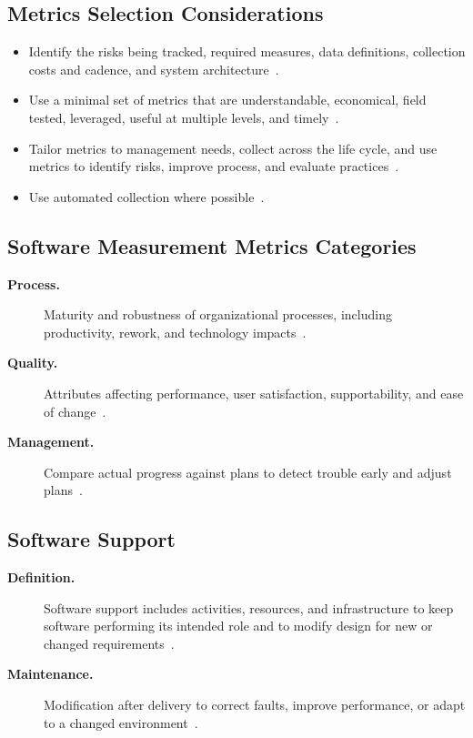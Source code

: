 \documentclass[../main.tex]{subfiles}
\begin{document}
\subsection{Metrics Selection Considerations}
\begin{itemize}
  \item Identify the risks being tracked, required measures, data definitions, collection costs and cadence, and system architecture~\autocite{edo-3-4-2-software-acquisition-management-2025}.
  \item Use a minimal set of metrics that are understandable, economical, field tested, leveraged, useful at multiple levels, and timely~\autocite{edo-3-4-2-software-acquisition-management-2025}.
  \item Tailor metrics to management needs, collect across the life cycle, and use metrics to identify risks, improve process, and evaluate practices~\autocite{edo-3-4-2-software-acquisition-management-2025}.
  \item Use automated collection where possible~\autocite{edo-3-4-2-software-acquisition-management-2025}.
\end{itemize}

\subsection{Software Measurement Metrics Categories}
\begin{description}
  \item[\textbf{Process.}] Maturity and robustness of organizational processes, including productivity, rework, and technology impacts~\autocite{edo-3-4-2-software-acquisition-management-2025}.
  \item[\textbf{Quality.}] Attributes affecting performance, user satisfaction, supportability, and ease of change~\autocite{edo-3-4-2-software-acquisition-management-2025}.
  \item[\textbf{Management.}] Compare actual progress against plans to detect trouble early and adjust plans~\autocite{edo-3-4-2-software-acquisition-management-2025}.
\end{description}

\subsection{Software Support}
\begin{description}
  \item[\textbf{Definition.}] Software support includes activities, resources, and infrastructure to keep software performing its intended role and to modify design for new or changed requirements~\autocite{edo-3-4-2-software-acquisition-management-2025}.
  \item[\textbf{Maintenance.}] Modification after delivery to correct faults, improve performance, or adapt to a changed environment~\autocite{edo-3-4-2-software-acquisition-management-2025}.
\end{description}
\end{document}

